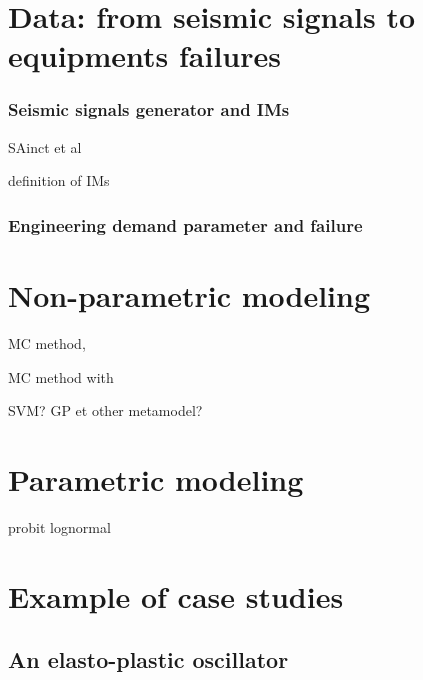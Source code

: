 






\section{Data: from seismic signals to equipments failures}


\subsubsection{Seismic signals generator and IMs}

SAinct et al

definition of IMs


\subsubsection{Engineering demand parameter and failure}





\section{Non-parametric modeling}

MC method,

MC method with 

SVM? GP et  other metamodel?




\section{Parametric modeling}

probit lognormal





\section{Example of case studies}

    \subsection{An elasto-plastic oscillator}

